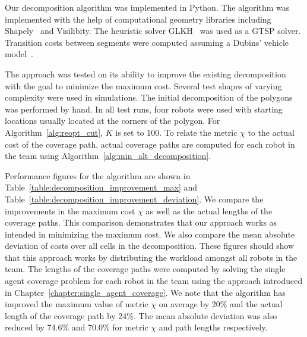 \documentclass[../main.tex]{subfiles}
\begin{document}
Our decomposition algorithm was implemented in Python. The algorithm was implemented with the help of computational geometry libraries including Shapely~\cite{Shapely:13} and Visilibity\cite{VisiLibity:08}. The heuristic solver GLKH~\cite{helsgaun2000effective} was used as a GTSP solver. Transition costs between segments were computed assuming a Dubins' vehicle model~\cite{dubins1957curves}.

The approach was tested on its ability to improve the existing decomposition with the goal to minimize the maximum cost. Several test shapes of varying complexity were used in simulations. The initial decomposition of the polygons was performed by hand. In all test runs, four robots were used with starting locations usually located at the corners of the polygon. For Algorithm~\ref{alg:reopt_cut}, $K$ is set to 100. To relate the metric $\chi$ to the actual cost of the coverage path, actual coverage paths are computed for each robot in the team using Algorithm~\ref{alg:min_alt_decomposition}.

Performance figures for the algorithm are shown in Table~\ref{table:decomposition_improvement_max} and Table~\ref{table:decomposition_improvement_deviation}. We compare the improvements in the maximum cost $\chi$ as well as the actual lengths of the coverage paths. This comparison demonstrates that our approach works as intended in minimizing the maximum cost. We also compare the mean absolute deviation of costs over all cells in the decomposition. These figures should show that this approach works by distributing the workload amongst all robots in the team. The lengths of the coverage paths were computed by solving the single agent coverage problem for each robot in the team using the approach introduced in Chapter~\ref{chapter:single_agent_coverage}. We note that the algorithm has improved the maximum value of metric $\chi$ on average by 20\% and the actual length of the coverage path by 24\%. The mean absolute deviation was also reduced by 74.6\% and 70.0\% for metric $\chi$ and path lengths respectively.
\end{document}

